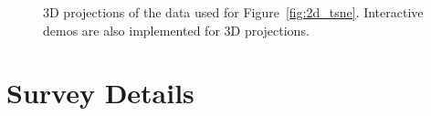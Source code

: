 \documentclass[runningheads,a4paper]{llncs}
\begin{document}
\begin{appendices}
\begin{figure}[]
\caption{3D projections of the data used for Figure~\ref{fig:2d_tsne}. Interactive demos are also implemented for 3D projections.}
\label{fig:3d_tsne}
\end{figure}


\chapter{Survey Details}
\label{appendix:surveys}

\end{appendices}
\end{document}
